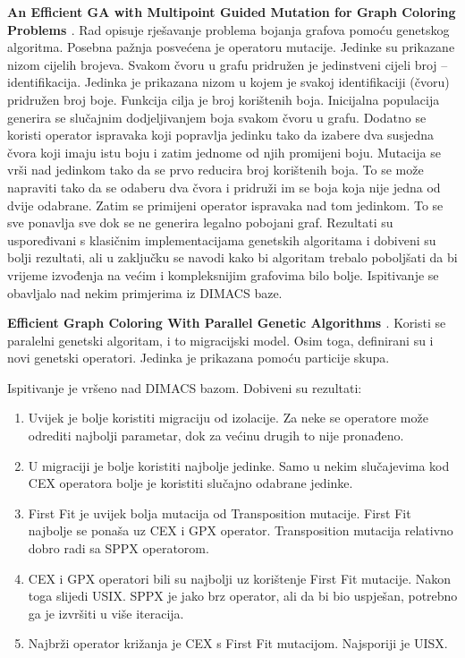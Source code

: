 \documentclass[times, utf8, diplomski, numeric]{fer}
\begin{document}
\textbf{An Efficient GA with Multipoint Guided Mutation for Graph Coloring Problems \cite{lit1}}.
Rad opisuje rješavanje problema bojanja grafova pomoću genetskog algoritma.
Posebna pažnja posvećena je operatoru mutacije.
Jedinke su prikazane nizom cijelih brojeva. Svakom čvoru u grafu pridružen je jedinstveni cijeli broj -- identifikacija.
Jedinka je prikazana nizom u kojem je svakoj identifikaciji (čvoru)
pridružen broj boje. Funkcija cilja je broj korištenih boja.
Inicijalna populacija generira se slučajnim dodjeljivanjem
boja svakom čvoru u grafu.
Dodatno se koristi operator ispravaka koji popravlja jedinku tako da izabere dva susjedna čvora koji imaju istu boju i zatim jednome od njih promijeni boju.
Mutacija se vrši nad jedinkom tako da se prvo reducira broj korištenih boja. To se može napraviti tako da se odaberu dva čvora i pridruži im se boja koja nije jedna od dvije odabrane.
Zatim se primijeni operator ispravaka nad tom jedinkom. To se sve ponavlja sve dok se ne generira legalno pobojani graf.
Rezultati su uspoređivani s klasičnim implementacijama genetskih algoritama i
dobiveni su bolji rezultati, ali u zaključku se navodi kako bi algoritam trebalo poboljšati da bi vrijeme
izvođenja na većim i kompleksnijim grafovima bilo bolje.
Ispitivanje se obavljalo nad nekim primjerima iz DIMACS baze.

\textbf{Efficient Graph Coloring With Parallel Genetic Algorithms \cite{lit2}}.
Koristi se paralelni genetski algoritam, i to migracijski model. Osim toga,
definirani su i novi genetski operatori. Jedinka je prikazana pomoću 
particije skupa. 

Ispitivanje je vršeno nad DIMACS bazom.
Dobiveni su rezultati:
\begin{enumerate}
\item Uvijek je bolje koristiti migraciju od izolacije. Za neke se operatore može odrediti najbolji parametar, dok za većinu drugih to nije pronađeno.

\item U migraciji je bolje koristiti najbolje jedinke. Samo u nekim slučajevima kod CEX operatora bolje je koristiti slučajno odabrane jedinke.

\item First Fit je uvijek bolja mutacija od Transposition mutacije. First Fit najbolje se ponaša uz CEX i GPX operator. Transposition mutacija relativno dobro radi sa SPPX operatorom.

\item CEX i GPX operatori bili su najbolji uz korištenje First Fit mutacije.
Nakon toga slijedi USIX. SPPX je jako brz operator, ali da bi bio uspješan,
potrebno ga je izvršiti u više iteracija.

\item Najbrži operator križanja je CEX s First Fit mutacijom. Najsporiji je UISX.
\end{enumerate}
\end{document}
